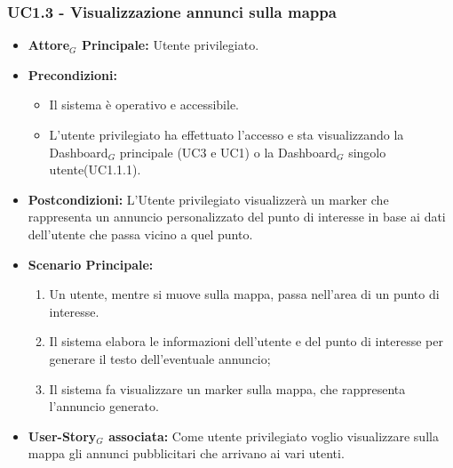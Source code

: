 \documentclass[11pt]{article}
\begin{document}
\begin{justify}
\subsubsection{\textbf{UC1.3 - Visualizzazione annunci sulla mappa}}
\label{UC1.3}
\begin{itemize}
    \item \textbf{Attore$_G$ Principale:} Utente privilegiato.
    \item \textbf{Precondizioni:} 
        \begin{itemize}
         \item Il sistema è operativo e accessibile.
    	\item L'utente privilegiato ha effettuato l'accesso e sta          visualizzando la Dashboard$_G$ principale (UC3 e UC1) o la Dashboard$_G$ singolo utente(UC1.1.1).
        \end{itemize}
    \item \textbf{Postcondizioni:} L'Utente privilegiato visualizzerà un marker che rappresenta un annuncio personalizzato del punto di interesse in base ai dati dell'utente che passa vicino a quel punto. 
    \item \textbf{Scenario Principale:} 
        \begin{enumerate}
    	\item Un utente, mentre si muove sulla mappa, passa nell'area      di un punto di interesse.
    	\item Il sistema elabora le informazioni dell'utente e del         punto di interesse per generare il testo dell'eventuale            annuncio;
        \item Il sistema fa visualizzare un marker sulla mappa, che rappresenta l'annuncio generato.
	\end{enumerate}
    \item \textbf{User-Story$_G$ associata:} Come utente privilegiato voglio visualizzare sulla mappa gli annunci pubblicitari che arrivano ai vari utenti.
\end{itemize}

\end{justify}
\end{document}

